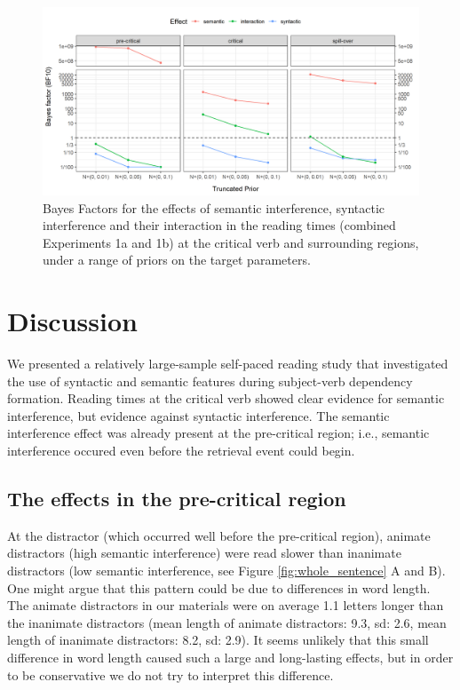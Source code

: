 \documentclass[a4paper, man, floatsintext]{apa7}
\begin{document}
\begin{figure}[H]
    \caption{Bayes Factors for the effects of semantic interference, syntactic interference and their interaction in the reading times (combined Experiments 1a and 1b) at the critical verb and surrounding regions, under a range of priors on the target parameters.}
    \label{fig:spr_bfs}
    \centering
    \includegraphics[width=\textwidth]{images/BF_plot_spr_774_allregions.png}
\end{figure}

\section{Discussion}
We presented a relatively large-sample self-paced reading study that investigated the use of syntactic and semantic features during subject-verb dependency formation. Reading times at the critical verb showed clear evidence for semantic interference, but evidence against syntactic interference. The semantic interference effect was already present at the pre-critical region; i.e., semantic interference occured even before the retrieval event could begin. 

\subsection{The effects in the pre-critical region}

At the distractor (which occurred well before the pre-critical region), animate distractors (high semantic interference) were read slower than inanimate distractors (low semantic interference, see Figure \ref{fig:whole_sentence} A and B). One might argue that this pattern could be due to differences in word length. The animate distractors in our materials were on average 1.1 letters longer than the inanimate distractors (mean length of animate distractors: 9.3, sd: 2.6, mean length of inanimate distractors: 8.2, sd: 2.9). It seems unlikely that this small difference in word length caused such a large and long-lasting effects, but in order to be conservative we do not try to interpret this difference.
\end{document}
